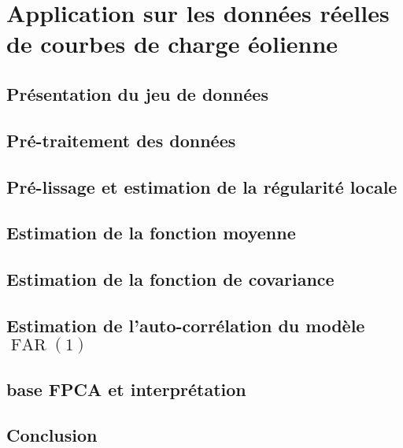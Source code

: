 \chapter{
    Application sur les données réelles de courbes de charge éolienne
}
\minitoc%

\section{Présentation du jeu de données}

\section{Pré-traitement des données}

\section{Pré-lissage et estimation de la régularité locale}

\section{Estimation de la fonction moyenne}

\section{Estimation de la fonction de covariance}

\section{Estimation de l'auto-corrélation du modèle $\operatorname{FAR}(1)$}

\section{base FPCA et interprétation}

\section{Conclusion}